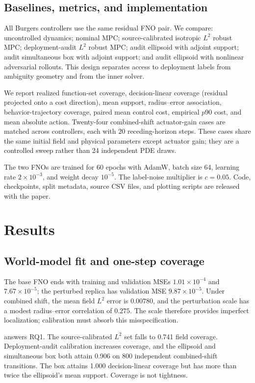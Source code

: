 \documentclass[10pt]{article}
\begin{document}
\subsection{Baselines, metrics, and implementation}

All Burgers controllers use the same residual FNO pair. We compare:
uncontrolled dynamics; nominal MPC; source-calibrated isotropic $L^2$ robust
MPC; deployment-audit $L^2$ robust MPC; audit ellipsoid with adjoint support;
audit simultaneous box with adjoint support; and audit ellipsoid with
nonlinear adversarial rollouts. This design separates access to deployment
labels from ambiguity geometry and from the inner solver.

We report realized function-set coverage, decision-linear coverage (residual
projected onto a cost direction), mean support, radius--error association,
behavior-trajectory coverage, paired mean control cost, empirical $p90$ cost,
and mean absolute action. Twenty-four combined-shift actuator-gain cases are
matched across controllers, each with 20 receding-horizon steps. These cases
share the same initial field and physical parameters except actuator gain;
they are a controlled sweep rather than 24 independent PDE draws.

The two FNOs are trained for 60 epochs with AdamW, batch size 64, learning rate
$2\times10^{-3}$, and weight decay $10^{-5}$. The label-noise multiplier is
$c=0.05$. Code, checkpoints, split metadata, source CSV files, and plotting
scripts are released with the paper.

\section{Results}

\subsection{World-model fit and one-step coverage}

The base FNO ends with training and validation MSEs
$1.01\times10^{-4}$ and $7.67\times10^{-5}$; the perturbed replica has
validation MSE $9.87\times10^{-5}$. Under combined shift, the mean field
$L^2$ error is $0.00780$, and the perturbation scale has a modest
radius--error correlation of $0.275$. The scale therefore provides imperfect
localization; calibration must absorb this misspecification.

 answers RQ1. The source-calibrated $L^2$ set falls
to 0.741 field coverage. Deployment-audit calibration increases coverage, and
the ellipsoid and simultaneous box both attain 0.906 on 800 independent
combined-shift transitions. The box attains 1.000 decision-linear coverage but
has more than twice the ellipsoid's mean support. Coverage is not tightness.
\end{document}
